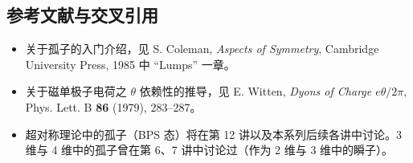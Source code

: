 
\subsection{参考文献与交叉引用}

\begin{itemize}
\item 关于孤子的入门介绍，见 S. Coleman, \emph{Aspects of Symmetry}, Cambridge University Press, 1985 中 “Lumps” 一章。
\item 关于磁单极子电荷之 $\theta$ 依赖性的推导，见 E. Witten, \emph{Dyons of Charge $e\theta/2\pi$}, Phys. Lett. B \textbf{86} (1979), 283--287。
\item 超对称理论中的孤子（BPS 态）将在第 12 讲以及本系列后续各讲中讨论。3 维与 4 维中的孤子曾在第 6、7 讲中讨论过（作为 2 维与 3 维中的瞬子）。
\end{itemize}
